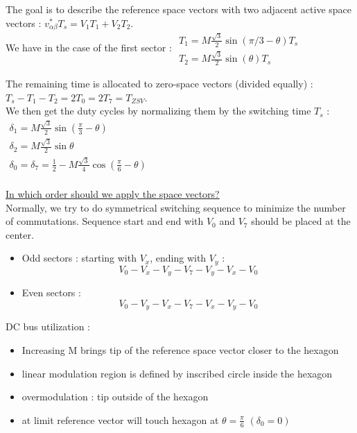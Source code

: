 \documentclass[../main.tex]{subfiles}
\begin{document}
The goal is to describe the reference space vectors with two adjacent active space vectors : $v_{\alpha \beta}^* T_s = V_1 T_1 + V_2 T_2$.\\
We have in the case of the first sector : $\begin{matrix}
    T_1 = M \frac{\sqrt{3}}{2} \sin(\pi/3 - \theta) T_s\\
    T_2 = M \frac{\sqrt{3}}{2} \sin (\theta) T_s
\end{matrix}$

The remaining time is allocated to zero-space vectors (divided equally) : $T_s - T_1 - T_2 = 2T_0 = 2T_7 = T_{ZSV}$. \\
We then get the duty cycles by normalizing them by the switching time $T_s$ : $\begin{matrix}
    \delta_1 = M \frac{\sqrt{3}}{2} \sin(\frac{\pi}{3}- \theta)\\
    \delta_2 = M \frac{\sqrt{3}}{2} \sin \theta\\
    \delta_0 = \delta_7 = \frac{1}{2} - M \frac{\sqrt{3}}{4} \cos(\frac{\pi}{6} - \theta)\\
\end{matrix}$

\quad \underline{In which order should we apply the space vectors?}\\
Normally, we try to do symmetrical switching sequence to minimize the number of commutations. Sequence start and end with $V_0$ and $V_7$ should be placed at the center.\\

\begin{itemize}
    \item Odd sectors : starting with $V_x$, ending with $V_y$ : \begin{equation}
        V_0 - V_x - V_y - V_7 - V_y - V_x - V_0
    \end{equation}
    \item Even sectors : \begin{equation}
        V_0 - V_y - V_x - V_7 - V_x - V_y - V_0
    \end{equation}
\end{itemize}


DC bus utilization : \begin{itemize}
    \item Increasing M brings tip of the reference space vector closer to the hexagon
    \item linear modulation region is defined by inscribed circle inside the hexagon
    \item overmodulation : tip outside of the hexagon
    \item at limit reference vector will touch hexagon at $\theta = \frac{\pi}{6}$ $(\delta_0 = 0)$
\end{itemize}
\end{document}

